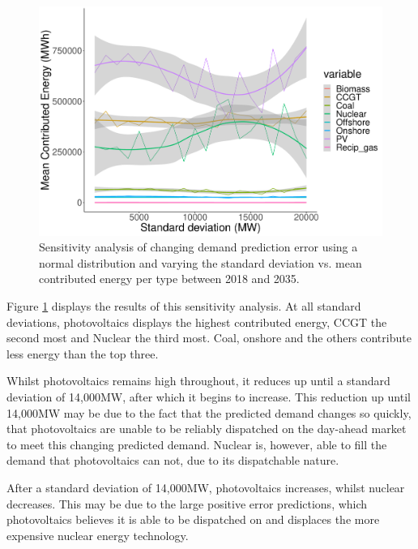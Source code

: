\documentclass[final,3p,times,twocolumn,numbers]{elsarticle}
\begin{document}
\begin{figure}[h]
\centering
\includegraphics[width=0.8\columnwidth,natwidth=800, natheight=550]{figures/results/sensitivity_analysis.pdf}
\caption{Sensitivity analysis of changing demand prediction error using a normal distribution and varying the standard deviation vs. mean contributed energy per type between 2018 and 2035.}
\label{fig:sensitivity-analysis}
\end{figure}

Figure \ref{fig:sensitivity-analysis} displays the results of this sensitivity analysis. At all standard deviations, photovoltaics displays the highest contributed energy, CCGT the second most and Nuclear the third most. Coal, onshore and the others contribute less energy than the top three.

Whilst photovoltaics remains high throughout, it reduces up until a standard deviation of 14,000MW, after which it begins to increase. This reduction up until 14,000MW may be due to the fact that the predicted demand changes so quickly, that photovoltaics are unable to be reliably dispatched on the day-ahead market to meet this changing predicted demand. Nuclear is, however, able to fill the demand that photovoltaics can not, due to its dispatchable nature.

After a standard deviation of 14,000MW, photovoltaics increases, whilst nuclear decreases. This may be due to the large positive error predictions, which photovoltaics believes it is able to be dispatched on and displaces the more expensive nuclear energy technology.




\end{document}
